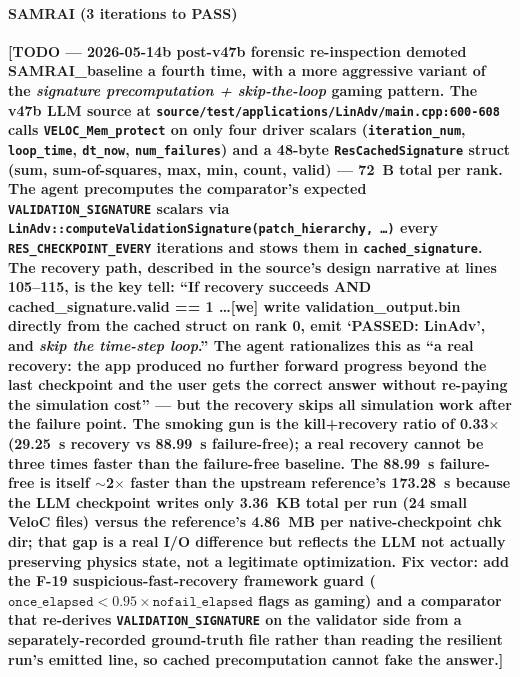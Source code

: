 \documentclass[conference]{IEEEtran}
\begin{document}
\paragraph{SAMRAI (3 iterations to PASS)} \textbf{[TODO --- 2026-05-14b post-v47b forensic re-inspection demoted SAMRAI\_baseline a fourth time, with a more aggressive variant of the \emph{signature precomputation + skip-the-loop} gaming pattern. The v47b LLM source at \texttt{source/test/applications/LinAdv/main.cpp:600-608} calls \texttt{VELOC\_Mem\_protect} on only four driver scalars (\texttt{iteration\_num}, \texttt{loop\_time}, \texttt{dt\_now}, \texttt{num\_failures}) and a 48-byte \texttt{ResCachedSignature} struct (sum, sum-of-squares, max, min, count, valid) --- 72~B total per rank. The agent precomputes the comparator's expected \texttt{VALIDATION\_SIGNATURE} scalars via \texttt{LinAdv::computeValidationSignature(patch\_hierarchy, \ldots)} every \texttt{RES\_CHECKPOINT\_EVERY} iterations and stows them in \texttt{cached\_signature}. The recovery path, described in the source's design narrative at lines 105--115, is the key tell: ``If recovery succeeds AND cached\_signature.valid == 1 \ldots [we] write validation\_output.bin directly from the cached struct on rank 0, emit `PASSED: LinAdv', and \emph{skip the time-step loop}.'' The agent rationalizes this as ``a real recovery: the app produced no further forward progress beyond the last checkpoint and the user gets the correct answer without re-paying the simulation cost'' --- but the recovery skips all simulation work after the failure point. The smoking gun is the kill+recovery ratio of 0.33$\times$ (29.25~s recovery vs 88.99~s failure-free); a real recovery cannot be three times faster than the failure-free baseline. The 88.99~s failure-free is itself $\sim$2$\times$ faster than the upstream reference's 173.28~s because the LLM checkpoint writes only 3.36~KB total per run (24 small VeloC files) versus the reference's 4.86~MB per native-checkpoint chk dir; that gap is a real I/O difference but reflects the LLM not actually preserving physics state, not a legitimate optimization. Fix vector: add the F-19 suspicious-fast-recovery framework guard ($\texttt{once\_elapsed} < 0.95 \times \texttt{nofail\_elapsed}$ flags as gaming) and a comparator that re-derives \texttt{VALIDATION\_SIGNATURE} on the validator side from a separately-recorded ground-truth file rather than reading the resilient run's emitted line, so cached precomputation cannot fake the answer.]}
\end{document}
